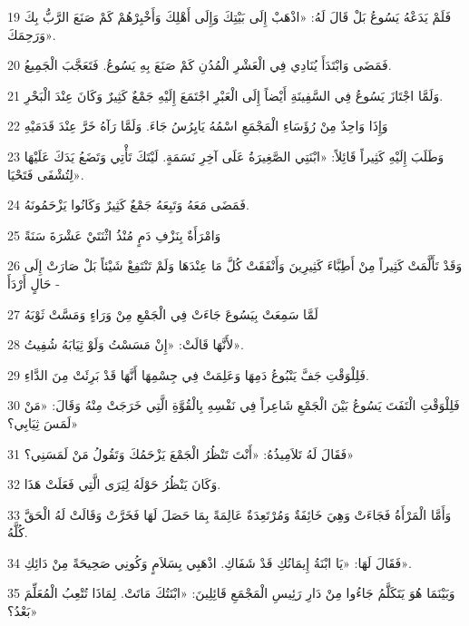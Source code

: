 \par 19 فَلَمْ يَدَعْهُ يَسُوعُ بَلْ قَالَ لَهُ: «اذْهَبْ إِلَى بَيْتِكَ وَإِلَى أَهْلِكَ وَأَخْبِرْهُمْ كَمْ صَنَعَ الرَّبُّ بِكَ وَرَحِمَكَ».
\par 20 فَمَضَى وَابْتَدَأَ يُنَادِي فِي الْعَشْرِ الْمُدُنِ كَمْ صَنَعَ بِهِ يَسُوعُ. فَتَعَجَّبَ الْجَمِيعُ.
\par 21 وَلَمَّا اجْتَازَ يَسُوعُ فِي السَّفِينَةِ أَيْضاً إِلَى الْعَبْرِ اجْتَمَعَ إِلَيْهِ جَمْعٌ كَثِيرٌ وَكَانَ عِنْدَ الْبَحْرِ.
\par 22 وَإِذَا وَاحِدٌ مِنْ رُؤَسَاءِ الْمَجْمَعِ اسْمُهُ يَايِرُسُ جَاءَ. وَلَمَّا رَآهُ خَرَّ عِنْدَ قَدَمَيْهِ
\par 23 وَطَلَبَ إِلَيْهِ كَثِيراً قَائِلاً: «ابْنَتِي الصَّغِيرَةُ عَلَى آخِرِ نَسَمَةٍ. لَيْتَكَ تَأْتِي وَتَضَعُ يَدَكَ عَلَيْهَا لِتُشْفَى فَتَحْيَا».
\par 24 فَمَضَى مَعَهُ وَتَبِعَهُ جَمْعٌ كَثِيرٌ وَكَانُوا يَزْحَمُونَهُ.
\par 25 وَامْرَأَةٌ بِنَزْفِ دَمٍ مُنْذُ اثْنَتَيْ عَشْرَةَ سَنَةً
\par 26 وَقَدْ تَأَلَّمَتْ كَثِيراً مِنْ أَطِبَّاءَ كَثِيرِينَ وَأَنْفَقَتْ كُلَّ مَا عِنْدَهَا وَلَمْ تَنْتَفِعْ شَيْئاً بَلْ صَارَتْ إِلَى حَالٍ أَرْدَأَ -
\par 27 لَمَّا سَمِعَتْ بِيَسُوعَ جَاءَتْ فِي الْجَمْعِ مِنْ وَرَاءٍ وَمَسَّتْ ثَوْبَهُ
\par 28 لأَنَّهَا قَالَتْ: «إِنْ مَسَسْتُ وَلَوْ ثِيَابَهُ شُفِيتُ».
\par 29 فَلِلْوَقْتِ جَفَّ يَنْبُوعُ دَمِهَا وَعَلِمَتْ فِي جِسْمِهَا أَنَّهَا قَدْ بَرِئَتْ مِنَ الدَّاءِ.
\par 30 فَلِلْوَقْتِ الْتَفَتَ يَسُوعُ بَيْنَ الْجَمْعِ شَاعِراً فِي نَفْسِهِ بِالْقُوَّةِ الَّتِي خَرَجَتْ مِنْهُ وَقَالَ: «مَنْ لَمَسَ ثِيَابِي؟»
\par 31 فَقَالَ لَهُ تَلاَمِيذُهُ: «أَنْتَ تَنْظُرُ الْجَمْعَ يَزْحَمُكَ وَتَقُولُ مَنْ لَمَسَنِي؟»
\par 32 وَكَانَ يَنْظُرُ حَوْلَهُ لِيَرَى الَّتِي فَعَلَتْ هَذَا.
\par 33 وَأَمَّا الْمَرْأَةُ فَجَاءَتْ وَهِيَ خَائِفَةٌ وَمُرْتَعِدَةٌ عَالِمَةً بِمَا حَصَلَ لَهَا فَخَرَّتْ وَقَالَتْ لَهُ الْحَقَّ كُلَّهُ.
\par 34 فَقَالَ لَهَا: «يَا ابْنَةُ إِيمَانُكِ قَدْ شَفَاكِ. اذْهَبِي بِسَلاَمٍ وَكُونِي صَحِيحَةً مِنْ دَائِكِ».
\par 35 وَبَيْنَمَا هُوَ يَتَكَلَّمُ جَاءُوا مِنْ دَارِ رَئِيسِ الْمَجْمَعِ قَائِلِينَ: «ابْنَتُكَ مَاتَتْ. لِمَاذَا تُتْعِبُ الْمُعَلِّمَ بَعْدُ؟»
